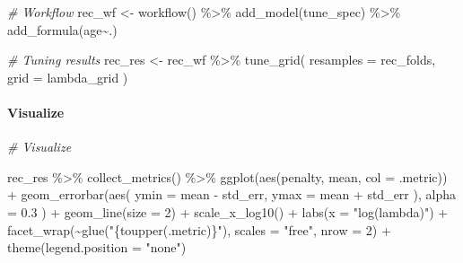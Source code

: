 \documentclass[
]{book}
\newenvironment{Shaded}{\begin{snugshade}}{\end{snugshade}}
\newcommand{\AttributeTok}[1]{\textcolor[rgb]{0.77,0.63,0.00}{#1}}
\newcommand{\CommentTok}[1]{\textcolor[rgb]{0.56,0.35,0.01}{\textit{#1}}}
\newcommand{\DecValTok}[1]{\textcolor[rgb]{0.00,0.00,0.81}{#1}}
\newcommand{\FloatTok}[1]{\textcolor[rgb]{0.00,0.00,0.81}{#1}}
\newcommand{\FunctionTok}[1]{\textcolor[rgb]{0.00,0.00,0.00}{#1}}
\newcommand{\NormalTok}[1]{#1}
\newcommand{\OtherTok}[1]{\textcolor[rgb]{0.56,0.35,0.01}{#1}}
\newcommand{\SpecialCharTok}[1]{\textcolor[rgb]{0.00,0.00,0.00}{#1}}
\newcommand{\StringTok}[1]{\textcolor[rgb]{0.31,0.60,0.02}{#1}}
\begin{document}
\begin{Shaded}
\begin{Highlighting}[]
\CommentTok{\# Workflow }
\NormalTok{rec\_wf }\OtherTok{\textless{}{-}} \FunctionTok{workflow}\NormalTok{() }\SpecialCharTok{\%\textgreater{}\%}
  \FunctionTok{add\_model}\NormalTok{(tune\_spec) }\SpecialCharTok{\%\textgreater{}\%}
  \FunctionTok{add\_formula}\NormalTok{(age}\SpecialCharTok{\textasciitilde{}}\NormalTok{.)}
\end{Highlighting}
\end{Shaded}

\begin{Shaded}
\begin{Highlighting}[]
\CommentTok{\# Tuning results }
\NormalTok{rec\_res }\OtherTok{\textless{}{-}}\NormalTok{ rec\_wf }\SpecialCharTok{\%\textgreater{}\%}
  \FunctionTok{tune\_grid}\NormalTok{(}
    \AttributeTok{resamples =}\NormalTok{ rec\_folds, }
    \AttributeTok{grid =}\NormalTok{ lambda\_grid}
\NormalTok{  )}
\end{Highlighting}
\end{Shaded}

\hypertarget{visualize}{%
\paragraph{Visualize}\label{visualize}}

\begin{Shaded}
\begin{Highlighting}[]
\CommentTok{\# Visualize}

\NormalTok{rec\_res }\SpecialCharTok{\%\textgreater{}\%}
  \FunctionTok{collect\_metrics}\NormalTok{() }\SpecialCharTok{\%\textgreater{}\%}
  \FunctionTok{ggplot}\NormalTok{(}\FunctionTok{aes}\NormalTok{(penalty, mean, }\AttributeTok{col =}\NormalTok{ .metric)) }\SpecialCharTok{+}
  \FunctionTok{geom\_errorbar}\NormalTok{(}\FunctionTok{aes}\NormalTok{(}
    \AttributeTok{ymin =}\NormalTok{ mean }\SpecialCharTok{{-}}\NormalTok{ std\_err,}
    \AttributeTok{ymax =}\NormalTok{ mean }\SpecialCharTok{+}\NormalTok{ std\_err}
\NormalTok{  ),}
  \AttributeTok{alpha =} \FloatTok{0.3}
\NormalTok{  ) }\SpecialCharTok{+}
  \FunctionTok{geom\_line}\NormalTok{(}\AttributeTok{size =} \DecValTok{2}\NormalTok{) }\SpecialCharTok{+}
  \FunctionTok{scale\_x\_log10}\NormalTok{() }\SpecialCharTok{+}
  \FunctionTok{labs}\NormalTok{(}\AttributeTok{x =} \StringTok{"log(lambda)"}\NormalTok{) }\SpecialCharTok{+}
  \FunctionTok{facet\_wrap}\NormalTok{(}\SpecialCharTok{\textasciitilde{}}\FunctionTok{glue}\NormalTok{(}\StringTok{"\{toupper(.metric)\}"}\NormalTok{), }
             \AttributeTok{scales =} \StringTok{"free"}\NormalTok{,}
             \AttributeTok{nrow =} \DecValTok{2}\NormalTok{) }\SpecialCharTok{+}
  \FunctionTok{theme}\NormalTok{(}\AttributeTok{legend.position =} \StringTok{"none"}\NormalTok{)}
\end{Highlighting}
\end{Shaded}
\end{document}
